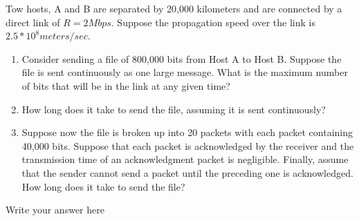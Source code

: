 \documentclass{report}
\begin{document}
\newpage


\begin{problem}
Tow hosts, A and B are separated by 20,000 kilometers and are connected by a direct link of $R=2Mbps$. Suppose the propagation speed over the link is $2.5*10^{8} meters/sec$.

\begin{enumerate}
\item Consider sending a file of 800,000 bits from Host A to Host B. Suppose the file is sent continuously as one large message. What is the maximum number of bits that will be in the link at any given time?
\item How long does it take to send the file, assuming it is sent continuously?
\item Suppose now the file is broken up into 20 packets with each packet containing 40,000 bits. Suppose that each packet is acknowledged by the receiver and the transmission time of an acknowledgment packet is negligible. Finally, assume that the sender cannot send a packet until the preceding one is acknowledged. How long does it take to send the file?
\end{enumerate}

    \begin{answer}{30em}
    Write your answer here
    \end{answer}

\end{problem}

\newpage
\end{document}
